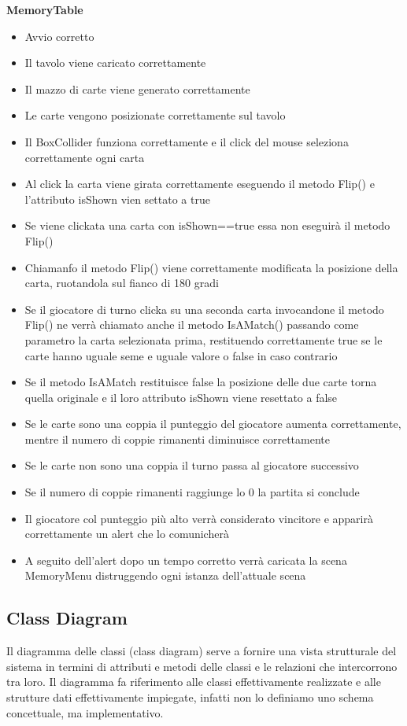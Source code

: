 \documentclass[12pt]{article}
\begin{document}
\textbf{\Large MemoryTable}
\begin{itemize}
\item Avvio corretto
\item Il tavolo viene caricato correttamente
\item Il mazzo di carte viene generato correttamente
\item Le carte vengono posizionate correttamente sul tavolo
\item Il BoxCollider funziona correttamente e il click del mouse seleziona correttamente ogni carta
\item Al click la carta viene girata correttamente eseguendo il metodo Flip() e l'attributo isShown vien settato a true
\item Se viene clickata una carta con isShown==true essa non eseguirà il metodo Flip()
\item Chiamanfo il metodo Flip() viene correttamente modificata la posizione della carta, ruotandola sul fianco di 180 gradi
\item Se il giocatore di turno clicka su una seconda carta invocandone il metodo Flip() ne verrà chiamato anche il metodo IsAMatch() passando come parametro la carta selezionata prima, restituendo correttamente true se le carte hanno uguale seme e uguale valore o false in caso contrario
\item Se il metodo IsAMatch restituisce false la posizione delle due carte torna quella originale e il loro attributo isShown viene resettato a false
\item Se le carte sono una coppia il punteggio del giocatore aumenta correttamente, mentre il numero di coppie rimanenti diminuisce correttamente
\item Se le carte non sono una coppia il turno passa al giocatore successivo
\item Se il numero di coppie rimanenti raggiunge lo 0 la partita si conclude
\item Il giocatore col punteggio più alto verrà considerato vincitore e apparirà correttamente un alert che lo comunicherà
\item A seguito dell'alert dopo un tempo corretto verrà caricata la scena MemoryMenu distruggendo ogni istanza dell'attuale scena
\end{itemize}

\subsection{Class Diagram}
Il diagramma delle classi (class diagram) serve a fornire una vista strutturale del sistema in termini di attributi e metodi delle classi e le relazioni che intercorrono tra loro. Il diagramma fa riferimento alle classi effettivamente realizzate e alle strutture dati effettivamente impiegate, infatti non lo definiamo uno schema concettuale, ma implementativo.
\end{document}
